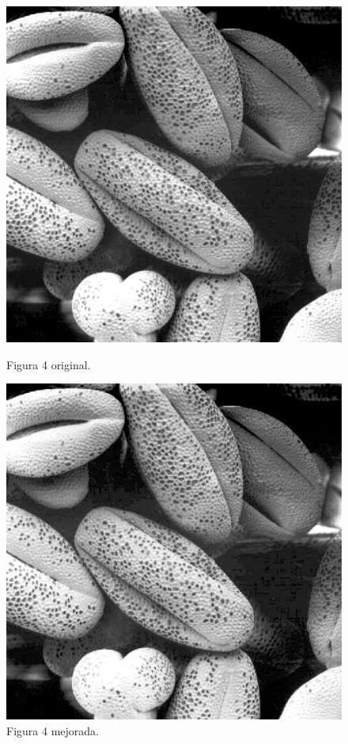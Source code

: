 \documentclass[11pt, letterpaper]{article}
\begin{document}
\begin{figure}[h]
	\centering
	\begin{minipage}{0.45\textwidth}
		\centering
		\includegraphics[width=\textwidth]{IMG/Fig3.15(a)4.jpg}
		\caption{Figura 4 original.}
		\label{fig:f23}
	\end{minipage}\hfill
	\begin{minipage}{0.45\textwidth}
		\centering
		\includegraphics[width=\textwidth]{RESULTADOS/img45.png}
		\caption{Figura 4 mejorada.}
		\label{fig:f24}
	\end{minipage}
	

\end{figure}
\end{document}
